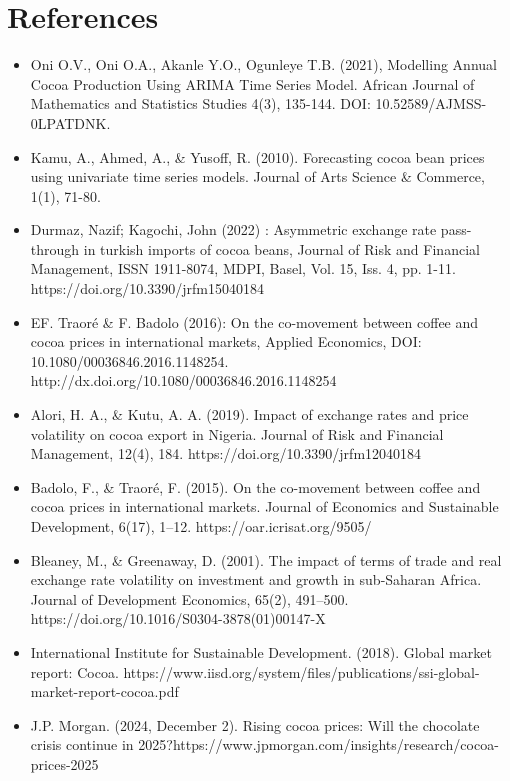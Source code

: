 \chapter{References}
\label{ch:reflection}
\begin{itemize}
  \item Oni O.V., Oni O.A., Akanle Y.O., Ogunleye T.B. (2021), Modelling Annual Cocoa Production Using ARIMA Time Series Model. African Journal of Mathematics and Statistics Studies 4(3), 135-144. DOI: 10.52589/AJMSS-0LPATDNK.
  \item Kamu, A., Ahmed, A., \& Yusoff, R. (2010). Forecasting cocoa bean prices using univariate time series models. Journal of Arts Science \& Commerce, 1(1), 71-80.
  \item Durmaz, Nazif; Kagochi, John (2022) : Asymmetric exchange rate pass-through in turkish imports of cocoa beans, Journal of Risk and Financial Management, ISSN 1911-8074, MDPI, Basel, Vol. 15, Iss. 4, pp. 1-11. https://doi.org/10.3390/jrfm15040184
  \item EF. Traoré \& F. Badolo (2016): On the co-movement between coffee and cocoa prices in international markets, Applied Economics, DOI: 10.1080/00036846.2016.1148254. http://dx.doi.org/10.1080/00036846.2016.1148254
  \item Alori, H. A., \& Kutu, A. A. (2019). Impact of exchange rates and price volatility on cocoa export in Nigeria. Journal of Risk and Financial Management, 12(4), 184. https://doi.org/10.3390/jrfm12040184
  \item Badolo, F., \& Traoré, F. (2015). On the co-movement between coffee and cocoa prices in international markets. Journal of Economics and Sustainable Development, 6(17), 1–12. https://oar.icrisat.org/9505/
  \item Bleaney, M., \& Greenaway, D. (2001). The impact of terms of trade and real exchange rate volatility on investment and growth in sub-Saharan Africa. Journal of Development Economics, 65(2), 491–500. https://doi.org/10.1016/S0304-3878(01)00147-X
  \item International Institute for Sustainable Development. (2018). Global market report: Cocoa. https://www.iisd.org/system/files/publications/ssi-global-market-report-cocoa.pdf
  \item J.P. Morgan. (2024, December 2). Rising cocoa prices: Will the chocolate crisis continue in 2025?https://www.jpmorgan.com/insights/research/cocoa-prices-2025
\end{itemize}